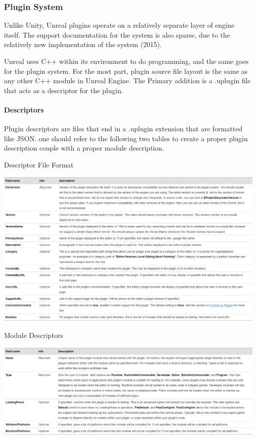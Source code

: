 \documentclass[12pt]{article}
\let\origfigure=\figure
\let\endorigfigure=\endfigure
\renewenvironment{figure}[1][]{%
  \origfigure[H]
}{%
  \endorigfigure
}
\begin{document}
\subsubsection{Plugin System}\label{plugin-system}

Unlike Unity, Unreal plugins operate on a relatively separate layer of
engine itself. The support documentation for the system is also sparse,
due to the relatively new implementation of the system (2015).

Unreal uses C++ within its environment to do programming, and the same
goes for the plugin system. For the most part, plugin source file layout
is the same as any other C++ module in Unreal Engine. The Primary
addition is a .uplugin file that acts as a descriptor for the plugin.

\paragraph{Descriptors}\label{descriptors}

Plugin descriptors are files that end in a .uplugin extension that are
formatted like JSON. one should refer to the following two tables to
create a proper plugin description couple with a proper module
description.

Descriptor File Format \autocite{unreal:plugins}

\begin{figure}
\centering
\includegraphics{Pictures/Descriptor.PNG}
\caption{Descriptor File Format}
\end{figure}

Module Descriptors \autocite{unreal:plugins}

\begin{figure}
\centering
\includegraphics{Pictures/ModuleD.PNG}
\caption{Module Descriptors}
\end{figure}
\end{document}
